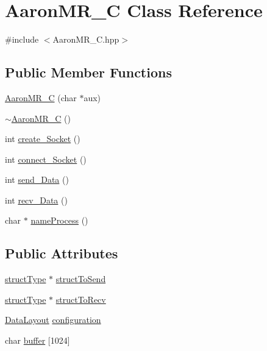 \hypertarget{classAaronMR__C}{
\section{AaronMR\_\-C Class Reference}
\label{classAaronMR__C}
}


{\ttfamily \#include $<$AaronMR\_\-C.hpp$>$}

\subsection*{Public Member Functions}
\begin{DoxyCompactItemize}
\item 
\hyperlink{classAaronMR__C_ad1ea14bf0324c7c0e949d6bbdb470c9f}{AaronMR\_\-C} (char $\ast$aux)
\item 
\hyperlink{classAaronMR__C_abd6b034820bde02aefa4fdfadd9f69cf}{$\sim$AaronMR\_\-C} ()
\item 
int \hyperlink{classAaronMR__C_a80336c4d4d506e411fc87197e421a74e}{create\_\-Socket} ()
\item 
int \hyperlink{classAaronMR__C_aa43f18cd24d1da804130719312ee6d42}{connect\_\-Socket} ()
\item 
int \hyperlink{classAaronMR__C_ab2a5e40571d0805caab35fb44cc14031}{send\_\-Data} ()
\item 
int \hyperlink{classAaronMR__C_a010df779aa65451b26faf2c21dc09319}{recv\_\-Data} ()
\item 
char $\ast$ \hyperlink{classAaronMR__C_abe83761aab74883139efa2f02646d193}{nameProcess} ()
\end{DoxyCompactItemize}
\subsection*{Public Attributes}
\begin{DoxyCompactItemize}
\item 
\hyperlink{classstructType}{structType} $\ast$ \hyperlink{classAaronMR__C_aef5db1ac136b77c2252b8c67b107b0ef}{structToSend}
\item 
\hyperlink{classstructType}{structType} $\ast$ \hyperlink{classAaronMR__C_ad52bc3b2c87324f45d8c3e72a005bf0a}{structToRecv}
\item 
\hyperlink{structDataLayout}{DataLayout} \hyperlink{classAaronMR__C_a5ab3b59be1481053d992e28e0b77be4d}{configuration}
\item 
char \hyperlink{classAaronMR__C_ab43e09c741489a54adfa0c2ec4668ea1}{buffer} \mbox{[}1024\mbox{]}
\end{DoxyCompactItemize}


